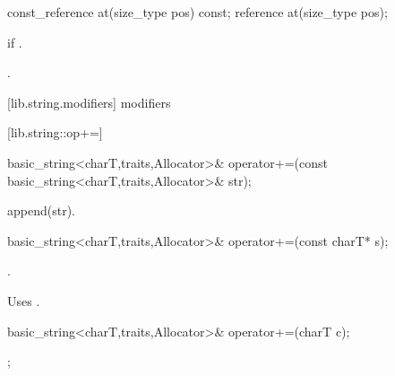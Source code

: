 %
%
\begin{itemdecl}
const_reference at(size_type pos) const;
reference       at(size_type pos);
\end{itemdecl}

\begin{itemdescr}
\pnum
\requires
{}

\pnum
\throws
{}
if
.

\pnum
\returns
{}.
\end{itemdescr}

[lib.string.modifiers]{ modifiers}

[lib.string::op+=]{}

%
%
\begin{itemdecl}
basic_string<charT,traits,Allocator>&
  operator+=(const basic_string<charT,traits,Allocator>& str);
\end{itemdecl}

\begin{itemdescr}
\pnum
\returns append(str).
\end{itemdescr}

%
%
\begin{itemdecl}
basic_string<charT,traits,Allocator>& operator+=(const charT* s);
\end{itemdecl}

\begin{itemdescr}
\pnum
\returns
{}.

\pnum
\notes
Uses .
\end{itemdescr}

%
%
\begin{itemdecl}
basic_string<charT,traits,Allocator>& operator+=(charT c);
\end{itemdecl}

\begin{itemdescr}
\pnum
\returns {};
\end{itemdescr}


